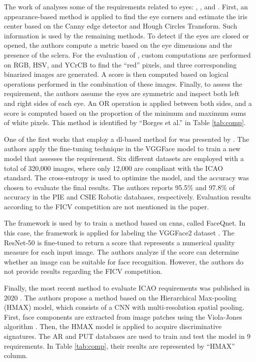 The work of \citet{borges2016analysis} analyses some of the requirements related to eyes: \citeReq{\eyesclosed}, \citeReq{\redeyes}, and \citeReq{\lookingaway}. First, an appearance-based method is applied to find the eye corners and estimate the iris center based on the Canny edge detector and Hough Circles Transform. Such information is used by the remaining methods. To detect if the eyes are closed or opened, the authors compute a metric based on the eye dimensions and the presence of the sclera. For the evaluation of \citeReq{\redeyes}, custom computations are performed on RGB, HSV, and YCrCB to find the ``red'' pixels, and three corresponding binarized images are generated. A score is then computed based on logical operations performed in the combination of these images. Finally, to assess the \citeReq{\lookingaway} requirement, the authors assume the eyes are symmetric and inspect both left and right sides of each eye. An OR operation is applied between both sides, and a score is computed based on the proportion of the minimum and maximum sums of white pixels. This method is identified by ``Borges et al.'' in Table \ref{tab:comp}.

One of the first works that employ a \acl{dl}-based method for \icao was presented by \cite{ahmadvand2018estimating}. The authors apply the fine-tuning technique in the VGGFace model \citep{simonyan2014very} to train a new model that assesses the \citeReq{\rollpitchyaw} requirement. Six different datasets are employed with a total of 320,000 images, where only 12,000 are compliant with the ICAO standard. The cross-entropy is used to optimize the model, and the accuracy was chosen to evaluate the final results. The authors reports 95.5\% and 97.8\% of accuracy in the PIE \citep{sim2002cmu} and CSIE Robotic \citep{csie2006database} databases, respectively. Evaluation results according to the FICV competition are not mentioned in the paper.

The \biolabicao framework is used by \cite{hernandez2019faceqnet} to train a method based on \aclp{cnn}, called FaceQnet. In this case, the framework is applied for labeling the VGGFace2 dataset \citep{cao2018vggface2}. The ResNet-50 \citep{he2016deep} is fine-tuned to return a score that represents a numerical quality measure for each input image. The authors analyze if the score can determine whether an image can be suitable for face recognition. However, the authors do not provide results regarding the FICV competition.

Finally, the most recent method to evaluate ICAO requirements was published in 2020 \citep{nourbakhshfacial}. The authors propose a method based on the Hierarchical Max-pooling (HMAX) model, which consists of a CNN with multi-resolution spatial pooling. First, face components are extracted from image patches using the Viola-Jones algorithm \citep{viola2001rapid}. Then, the HMAX model is applied to acquire discriminative signatures. The AR \citep{martinez1998ar} and PUT \citep{kasinski2008put} databases are used to train and test the model in 9 requirements. In Table \ref{tab:comp}, their results are represented by ``HMAX'' column.

